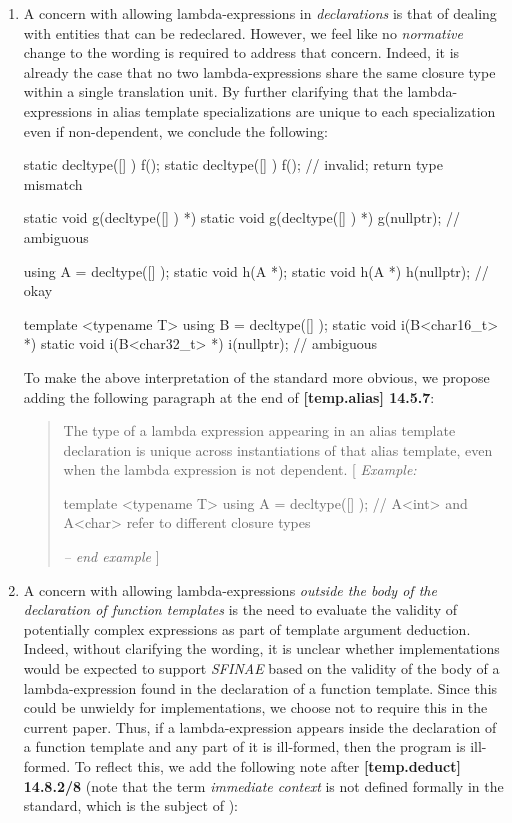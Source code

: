 \documentclass[11pt]{article}
\begin{document}
\begin{enumerate}
  \item A concern with allowing lambda-expressions in \textit{declarations} is
  that of dealing with entities that can be redeclared. However, we feel like
  no \textit{normative} change to the wording is required to address that concern.
  Indeed, it is already the case that no two lambda-expressions share the same
  closure type within a single translation unit. By further clarifying that the
  lambda-expressions in alias template specializations are unique to each
  specialization even if non-dependent, we conclude the following:

\begin{cpp}
static decltype([] { }) f();
static decltype([] { }) f(); // invalid; return type mismatch

static void g(decltype([] { }) *) { }
static void g(decltype([] { }) *) { }
g(nullptr); // ambiguous

using A = decltype([] { });
static void h(A *);
static void h(A *) { }
h(nullptr); // okay

template <typename T>
using B = decltype([] { });
static void i(B<char16_t> *) { }
static void i(B<char32_t> *) { }
i(nullptr); // ambiguous
\end{cpp}

  To make the above interpretation of the standard more obvious, we propose
  adding the following paragraph at the end of \textbf{[temp.alias] 14.5.7}:
  \begin{quote}
    The type of a lambda expression appearing in an alias template declaration
    is unique across instantiations of that alias template, even when the
    lambda expression is not dependent.
    [ \textit{Example:}
\begin{cpp}
template <typename T>
using A = decltype([] {});
// A<int> and A<char> refer to different closure types
\end{cpp}
    \textit{-- end example} ]
  \end{quote}


  \item A concern with allowing lambda-expressions \textit{outside the body of
  the declaration of function templates} is the need to evaluate the validity
  of potentially complex expressions as part of template argument deduction.
  Indeed, without clarifying the wording, it is unclear whether implementations
  would be expected to support \textit{SFINAE} based on the validity of
  the body of a lambda-expression found in the declaration of a function
  template. Since this could be unwieldy for implementations, we choose not
  to require this in the current paper. Thus, if a lambda-expression appears
  inside the declaration of a function template and any part of it is ill-formed,
  then the program is ill-formed. To reflect this, we add the following note
  after \textbf{[temp.deduct] 14.8.2/8} (note that the term \textit{immediate
  context} is not defined formally in the standard, which is the subject of
  \cite{CWG1844}):


\end{enumerate}
\end{document}
